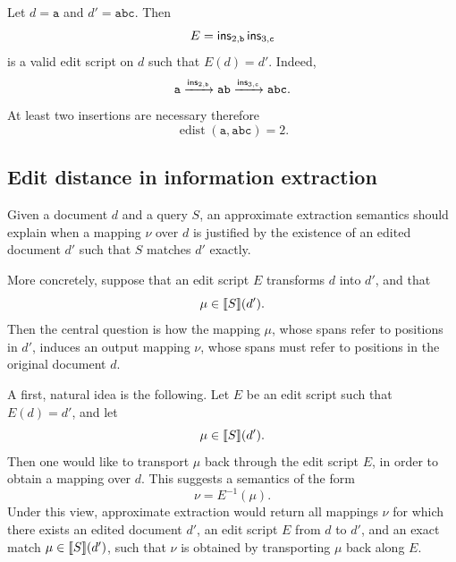 \begin{example}
	Let $d=\mathtt{a}$ and $d'=\mathtt{abc}$. Then
	\[
	E=\mathsf{ins}_{2,\mathtt{b}}\,\mathsf{ins}_{3,\mathtt{c}}
	\]
	is a valid edit script on $d$ such that $E(d)=d'$. Indeed,
	\[
	\mathtt{a}
	\xrightarrow{\mathsf{ins}_{2,\mathtt{b}}}
	\mathtt{ab}
	\xrightarrow{\mathsf{ins}_{3,\mathtt{c}}}
	\mathtt{abc}.
	\]
	At least two insertions are necessary therefore
	\[
	\operatorname{edist}(\mathtt{a},\mathtt{abc})=2.
	\]
\end{example}



\subsection{Edit distance in information extraction}

Given a document \(d\) and a query
\(S\), an approximate extraction semantics should explain when a mapping
\(\nu\) over \(d\) is justified by the existence of an edited document \(d'\)
such that \(S\) matches \(d'\) exactly.

More concretely, suppose that an edit script \(E\) transforms \(d\) into \(d'\),
and that
\[
\mu\in\llbracket S \rrbracket(d').
\]
Then the central question is how the mapping \(\mu\), whose spans refer to
positions in \(d'\), induces an output mapping \(\nu\), whose spans must refer to
positions in the original document \(d\).

A first, natural idea is the following. Let \(E\) be an edit script such that
\(E(d)=d'\), and let
\[
\mu\in\llbracket S \rrbracket(d').
\]
Then one would like to transport \(\mu\) back through the edit script \(E\), in
order to obtain a mapping over \(d\). This suggests a semantics of the form
\[
\nu = E^{-1}(\mu).
\]
Under this view, approximate extraction would return all mappings \(\nu\) for
which there exists an edited document \(d'\), an edit script \(E\) from \(d\) to
\(d'\), and an exact match \(\mu\in\llbracket S \rrbracket(d')\), such that \(\nu\) is obtained
by transporting \(\mu\) back along \(E\).

%
%	

